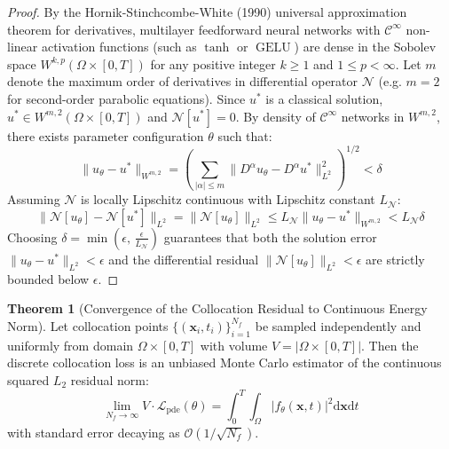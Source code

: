 \documentclass[11pt,a4paper]{article}
\theoremstyle{definition}
\newtheorem{theorem}{\textbf{Theorem}}[section]
\begin{document}
\begin{proof}
By the Hornik-Stinchcombe-White (1990) universal approximation theorem for derivatives, multilayer feedforward neural networks with $\mathcal{C}^\infty$ non-linear activation functions (such as $\tanh$ or $\operatorname{GELU}$) are dense in the Sobolev space $W^{k, p}(\Omega \times [0, T])$ for any positive integer $k \ge 1$ and $1 \le p < \infty$.
Let $m$ denote the maximum order of derivatives in differential operator $\mathcal{N}$ (e.g. $m = 2$ for second-order parabolic equations).
Since $u^*$ is a classical solution, $u^* \in W^{m, 2}(\Omega \times [0, T])$ and $\mathcal{N}[u^*] = 0$.
By density of $\mathcal{C}^\infty$ networks in $W^{m, 2}$, there exists parameter configuration $\theta$ such that:
{\boldmath
\begin{equation}
\|u_\theta - u^*\|_{W^{m, 2}} = \left( \sum_{|\alpha| \le m} \|D^\alpha u_\theta - D^\alpha u^*\|_{L^2}^2 \right)^{1/2} < \delta
\end{equation}
}
Assuming $\mathcal{N}$ is locally Lipschitz continuous with Lipschitz constant $L_{\mathcal{N}}$:
{\boldmath
\begin{equation}
\|\mathcal{N}[u_\theta] - \mathcal{N}[u^*]\|_{L^2} = \|\mathcal{N}[u_\theta]\|_{L^2} \le L_{\mathcal{N}} \|u_\theta - u^*\|_{W^{m, 2}} < L_{\mathcal{N}} \delta
\end{equation}
}
Choosing $\delta = \min\left( \epsilon, \, \frac{\epsilon}{L_{\mathcal{N}}} \right)$ guarantees that both the solution error $\|u_\theta - u^*\|_{L^2} < \epsilon$ and the differential residual $\|\mathcal{N}[u_\theta]\|_{L^2} < \epsilon$ are strictly bounded below $\epsilon$.
\end{proof}

\begin{theorem}[Convergence of the Collocation Residual to Continuous Energy Norm]
Let collocation points $\{(\mathbf{x}_i, t_i)\}_{i=1}^{N_f}$ be sampled independently and uniformly from domain $\Omega \times [0, T]$ with volume $V = |\Omega \times [0, T]|$. Then the discrete collocation loss is an unbiased Monte Carlo estimator of the continuous squared $L_2$ residual norm:
{\boldmath
\begin{equation}
\lim_{N_f \to \infty} V \cdot \mathcal{L}_{\text{pde}}(\theta) = \int_0^T \int_\Omega |f_\theta(\mathbf{x}, t)|^2 \mathrm{d}\mathbf{x} \mathrm{d}t
\end{equation}
}
with standard error decaying as $\mathcal{O}(1 / \sqrt{N_f})$.
\end{theorem}
\end{document}
